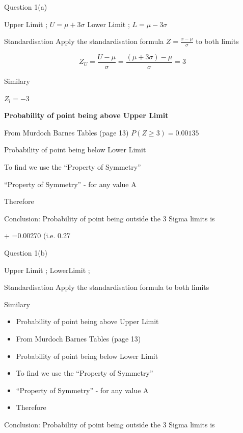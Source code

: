 ﻿\documentclass[]{report}
\begin{document}


Question 1(a)

Upper Limit ;  $U = \mu + 3 \sigma $
Lower Limit ;  $L = \mu - 3 \sigma $

Standardisation
Apply the standardisation formula	$Z=\frac{x-\mu}{\sigma} $	to both limits

\[ Z_U = \frac{U-\mu}{\sigma} =  \frac{(\mu + 3 \sigma)-\mu}{\sigma} = 3\]

Similary

$Z_l=-3$ 

\noindent \textbf{Probability of point being above Upper Limit}

From Murdoch Barnes Tables (page 13)  $P(Z \geq 3)=0.00135$

Probability of point being below Lower Limit


To find   we use the “Property of Symmetry”

“Property of Symmetry” -   for any value A

Therefore 

Conclusion: 
Probability of point being outside the 3 Sigma limits is

+ =0.00270 	(i.e. 0.27%



Question 1(b)

Upper Limit ;  
LowerLimit ;  

Standardisation
Apply the standardisation formula	 	to both limits


Similary

\begin{itemize}
	\item 		Probability of point being above Upper Limit
	
	\item 	From Murdoch Barnes Tables (page 13)  
	
	\item 	Probability of point being below Lower Limit
	
	
	\item 	To find   we use the “Property of Symmetry”
	
	\item 	“Property of Symmetry” -   for any value A
	
	\item 	Therefore 
\end{itemize}	



Conclusion: 
Probability of point being outside the 3 Sigma limits is
\end{document}
